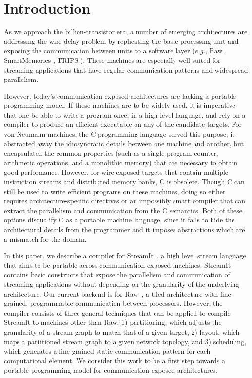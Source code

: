 \section{Introduction}

As we approach the billion-transistor era, a number of emerging
architectures are addressing the wire delay problem by replicating the
basic processing unit and exposing the communication between units to
a software layer ({\it e.g.}, Raw \cite{raw}, SmartMemories
\cite{smartmemories}, TRIPS \cite{trips}).  These machines are
especially well-suited for streaming applications that have regular
communication patterns and widespread parallelism.

However, today's communication-exposed architectures are lacking a
portable programming model.  If these machines are to be widely used,
it is imperative that one be able to write a program once, in a
high-level language, and rely on a compiler to produce an efficient
executable on any of the candidate targets. For von-Neumann machines,
the C programming language served this purpose; it abstracted away the
idiosyncratic details between one machine and another, but
encapsulated the common properties (such as a single program counter,
arithmetic operations, and a monolithic memory) that are necessary to
obtain good performance.  However, for wire-exposed targets that
contain multiple instruction streams and distributed memory banks, C
is obsolete.  Though C can still be used to write efficient programs
on these machines, doing so either requires architecture-specific
directives or an impossibly smart compiler that can extract the
parallelism and communication from the C semantics.  Both of these
options disqualify C as a portable machine language, since it fails to
hide the architectural details from the programmer and it imposes
abstractions which are a mismatch for the domain.

In this paper, we describe a compiler for StreamIt~\cite{streamitcc},
a high level stream language that aims to be portable across
communication-exposed machines.  StreamIt contains basic constructs
that expose the parallelism and communication of streaming
applications without depending on the granularity of the underlying
architecture.  Our current backend is for Raw~\cite{raw}, a tiled
architecture with fine-grained, programmable communication between
processors.  However, the compiler consists of three general
techniques that can be applied to compile StreamIt to machines other
than Raw: 1) partitioning, which adjusts the granularity of a stream
graph to match that of a given target, 2) layout, which maps a
partitioned stream graph to a given network topology, and 3)
scheduling, which generates a fine-grained static communication
pattern for each computational element.  We consider this work to be a
first step towards a portable programming model for
communication-exposed architectures.

